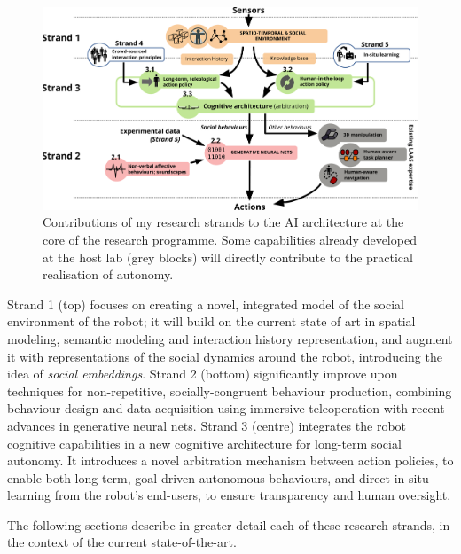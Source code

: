 \begin{figure}[h!]
\centering
\includegraphics[width=\linewidth]{figs/archi}
\caption{Contributions of my research strands to the AI architecture at the core
    of the research programme. Some capabilities already developed at the host
    lab (grey blocks) will directly contribute to the practical realisation of autonomy.}
\label{fig:archi}
\end{figure}


Strand 1 (top) focuses on creating a novel, integrated model of the social
environment of the robot; it will build on the current state of art in spatial
modeling, semantic modeling and interaction history representation, and augment
it with representations of the social dynamics around the robot, introducing the
idea of \emph{social embeddings}. Strand 2 (bottom) significantly improve upon
techniques for non-repetitive, socially-congruent behaviour production,
combining behaviour design and data acquisition using immersive teleoperation
with recent advances in generative neural nets. Strand 3 (centre) integrates the
robot cognitive capabilities in a new cognitive architecture for long-term
social autonomy. It introduces a novel arbitration mechanism between action
policies, to enable both long-term, goal-driven autonomous behaviours, and
direct in-situ learning from the robot's end-users, to ensure transparency and
human oversight.


The following sections describe in greater detail each of these research
strands, in the context of the current state-of-the-art.

